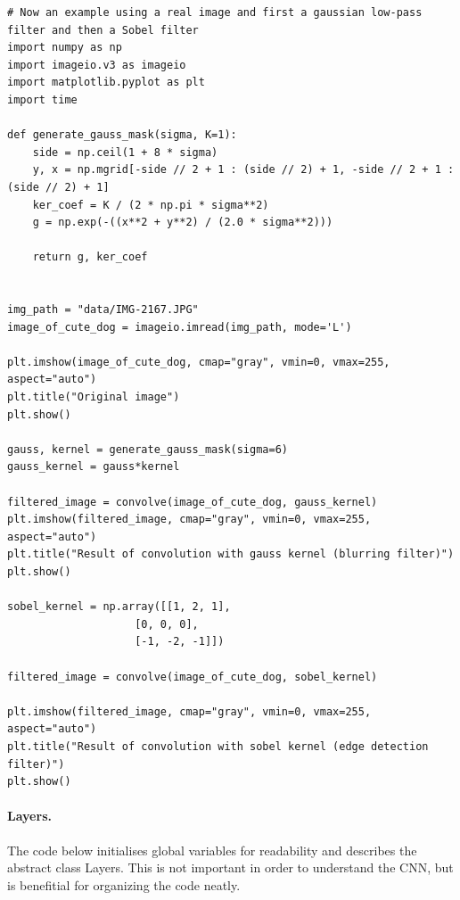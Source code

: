\documentclass[%
oneside,                 %
final,                   %
10pt]{article}
\begin{document}
\begin{verbatim}
# Now an example using a real image and first a gaussian low-pass filter and then a Sobel filter
import numpy as np
import imageio.v3 as imageio
import matplotlib.pyplot as plt
import time

def generate_gauss_mask(sigma, K=1):
    side = np.ceil(1 + 8 * sigma)
    y, x = np.mgrid[-side // 2 + 1 : (side // 2) + 1, -side // 2 + 1 : (side // 2) + 1]
    ker_coef = K / (2 * np.pi * sigma**2)
    g = np.exp(-((x**2 + y**2) / (2.0 * sigma**2)))

    return g, ker_coef


img_path = "data/IMG-2167.JPG"
image_of_cute_dog = imageio.imread(img_path, mode='L')

plt.imshow(image_of_cute_dog, cmap="gray", vmin=0, vmax=255, aspect="auto")
plt.title("Original image")
plt.show()

gauss, kernel = generate_gauss_mask(sigma=6)
gauss_kernel = gauss*kernel

filtered_image = convolve(image_of_cute_dog, gauss_kernel)
plt.imshow(filtered_image, cmap="gray", vmin=0, vmax=255, aspect="auto")
plt.title("Result of convolution with gauss kernel (blurring filter)")
plt.show()

sobel_kernel = np.array([[1, 2, 1],
                    [0, 0, 0], 
                    [-1, -2, -1]])

filtered_image = convolve(image_of_cute_dog, sobel_kernel)

plt.imshow(filtered_image, cmap="gray", vmin=0, vmax=255, aspect="auto")
plt.title("Result of convolution with sobel kernel (edge detection filter)")
plt.show()

\end{verbatim}


\paragraph{Layers.}
The code below initialises global variables for readability and
describes the abstract class Layers. This is not important in order to
understand the CNN, but is benefitial for organizing the code neatly.
\end{document}
